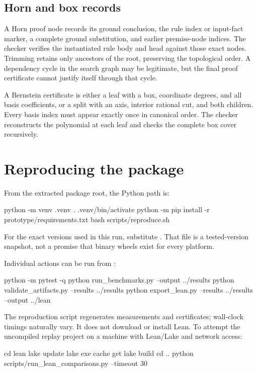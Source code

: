 \documentclass[11pt,a4paper]{article}
\begin{document}
\subsection{Horn and box records}

A Horn proof node records its ground conclusion, the rule index or input-fact
marker, a complete ground substitution, and earlier premise-node indices.
The checker verifies the instantiated rule body and head against those exact
nodes. Trimming retains only ancestors of the root, preserving the topological
order. A dependency cycle in the search graph may be legitimate, but the final
proof certificate cannot justify itself through that cycle.

A Bernstein certificate is either a leaf with a box, coordinate degrees, and
all basis coefficients, or a split with an axis, interior rational cut, and
both children. Every basis index must appear exactly once in canonical order.
The checker reconstructs the polynomial at each leaf and checks the complete
box cover recursively.

\section{Reproducing the package}

From the extracted package root, the Python path is:
\begin{Code}
python -m venv .venv
. .venv/bin/activate
python -m pip install -r prototype/requirements.txt
bash scripts/reproduce.sh
\end{Code}

For the exact versions used in this run, substitute
. That file is a tested-version
snapshot, not a promise that binary wheels exist for every platform.

Individual actions can be run from :
\begin{Code}
python -m pytest -q
python run_benchmarks.py --output ../results
python validate_artifacts.py --results ../results
python export_lean.py --results ../results --output ../lean
\end{Code}

The reproduction script regenerates measurements and certificates; wall-clock
timings naturally vary. It does not download or install Lean. To attempt the
uncompiled replay project on a machine with Lean/Lake and network access:
\begin{Code}
cd lean
lake update
lake exe cache get
lake build
cd ..
python scripts/run_lean_comparisons.py --timeout 30
\end{Code}
\end{document}

